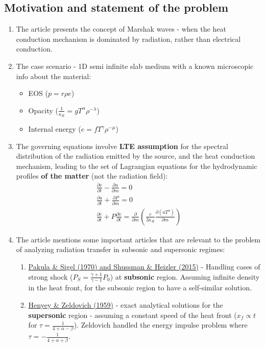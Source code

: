 \documentclass[11pt]{article}
\begin{document}
\subsection{Motivation and statement of the problem}
\begin{enumerate}
  \item The article presents the concept of Marshak waves - when the heat conduction mechanism is dominated by radiation, rather than electrical conduction.
  \item The case scenario - 1D semi infinite slab medium with a known microscopic info about the material:
  \begin{itemize}
    \item EOS ($p = r \rho e$)
    \item Opacity ($\frac{1}{\kappa_R} = g T^\alpha \rho^{-\lambda}$)
    \item Internal energy ($e = f T^\gamma \rho^{-\mu}$)
  \end{itemize}
  \item The governing equations involve \textbf{LTE assumption} for the spectral distribution of the radiation emitted by the source, and the heat conduction mechanism, leading to the set of Lagrangian equations for the hydrodynamic profiles \textbf{of the matter} (not the radiation field):
  \begin{gather}
    \frac{\partial v}{\partial t} - \frac{\partial u}{\partial m} = 0 \\
    \frac{\partial u}{\partial t} + \frac{\partial P}{\partial m} = 0 \\
    \frac{\partial e}{\partial t} + P \frac{\partial v}{\partial t} = \frac{\partial}{\partial m} \left( \frac{c}{3\kappa_R} \frac{\partial (aT^4)}{\partial m} \right)
  \end{gather}
  \item The article mentions some important articles that are relevant to the problem of analyzing radiation transfer in subsonic and supersonic regimes:
  \begin{enumerate}
    \item \uline{Pakula \& Sigel (1970) and Shussman \& Heizler (2015)} - Handling cases of strong shock ($P_S = \frac{\gamma + 1}{\gamma - 1}P_0$) at \textbf{subsonic} region. Assuming infinite density in the heat front, for the subsonic region to have a self-similar solution.
    \item \uline{Henyey \& Zeldovich (1959)} - exact analytical solutions for the \textbf{supersonic} region - assuming a constant speed of the heat front ($x_f \propto t$ for $\tau = \frac{1}{4+\alpha-\beta}$). Zeldovich handled the energy impulse problem where $\tau = -\frac{1}{4+\alpha+\beta}$.

\end{enumerate}
\end{enumerate}
\end{document}
